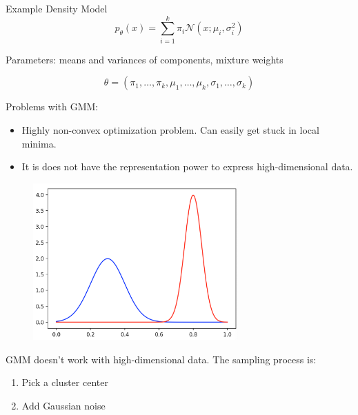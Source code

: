 \begin{frame}[allowframebreaks]

\begin{myconceptblock}{10.2}{Example Density Model}
    $$
    p_{\theta}(x)=\sum_{i=1}^{k} \pi_{i} \mathcal{N}\left(x ; \mu_{i}, \sigma_{i}^{2}\right)
    $$

    Parameters: means and variances of components, mixture weights

    $$
    \theta=\left(\pi_{1}, \ldots, \pi_{k}, \mu_{1}, \ldots, \mu_{k}, \sigma_{1}, \ldots, \sigma_{k}\right)
    $$

    Problems with GMM:

    \begin{itemize}
        \item Highly non-convex optimization problem. Can easily get stuck in local minima.
        \item It is does not have the representation power to express high-dimensional data.
    \end{itemize}

    \begin{figure}[H]
        \centering
        \includegraphics[width=0.7\textwidth]{.././assets/10.1.png}
    \end{figure}

    \par\noindent\textcolor{gray}{\hdashrule{\textwidth}{0.4pt}{1pt 2pt}}

    GMM doesn't work with high-dimensional data. The sampling process is:

    \begin{enumerate}
        \item Pick a cluster center
        \item Add Gaussian noise
    \end{enumerate}


\end{myconceptblock}
\end{frame}
